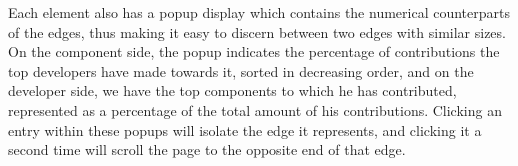 Each element also has a popup display which contains the numerical counterparts of the edges, thus making it easy to discern between two edges with similar sizes.
On the component side, the popup indicates the percentage of contributions the top developers have made towards it, sorted in decreasing order, and on the developer side, we have the top components to which he has contributed, represented as a percentage of the total amount of his contributions.
Clicking an entry within these popups will isolate the edge it represents, and clicking it a second time will scroll the page to the opposite end of that edge.